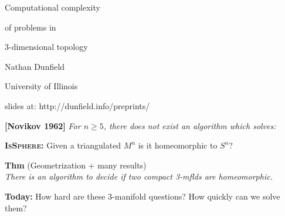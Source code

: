 \documentclass[aspect=4:3]{nmd/slide}
\newcommand{\alg}[1]{\textsc{\textbf{#1}}}
\begin{document}
\begin{frame}

  \begin{center}
    {\Large Computational complexity}
    
    \medskip

    {\Large  of problems in }

    \medskip

    {\Large  3-dimensional topology}

    \vspace{2cm}

    {Nathan Dunfield}

    \smallskip

    University of Illinois

    \vspace{1cm}
    
    slides at: http://dunfield.info/preprints/
    
  \end{center}
\end{frame}

\begin{frame}

\textbf{[Novikov 1962]} \textsl{For $n \geq 5$, there does not exist an algorithm which solves:}

\vspace{0.2cm}

\alg{IsSphere:} Given a triangulated $M^n$ is it homeomorphic to $S^n$?

\vspace{1cm}

\textbf{Thm} (Geometrization + many results)  \\
\textsl{There is an algorithm to decide if two compact 3-mflds are homeomorphic.}

\vspace{3cm}

\textbf{Today:}  How hard are these 3-manifold questions?  How quickly can we solve them?

\vfill
\end{frame}
\end{document}
